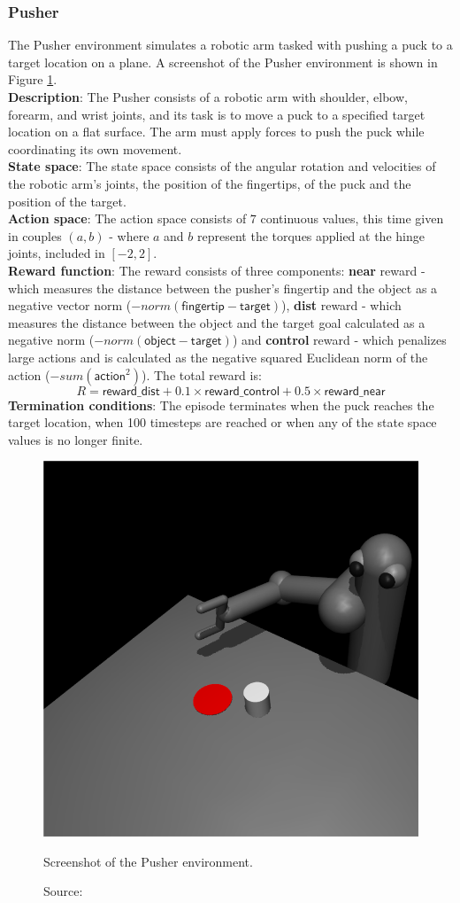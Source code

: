 \subsubsection{Pusher}

The Pusher environment \cite{pusherfarama} simulates
a robotic arm tasked with pushing a puck to a target
location on a plane.
A screenshot of the Pusher environment is shown in Figure \ref{fig:pusher}.\\
\textbf{Description}: The Pusher consists of a
robotic arm with shoulder, elbow, forearm, and wrist joints,
and its task is to move a puck to a specified
target location on a flat surface.
The arm must apply forces to push the puck while
coordinating its own movement.\\
\textbf{State space}: The state space consists
of the angular rotation and velocities of the robotic arm's joints,
the position of the fingertips, of the puck and the position of the target.\\
\textbf{Action space}: The action space consists of $7$ continuous values,
this time given in couples $(a,b)$ - where 
$a$ and $b$ represent the torques applied at the hinge joints,
included in $[-2, 2]$.\\
\textbf{Reward function}: The reward consists of three components:
\textbf{near} reward - which measures the distance between the
pusher's fingertip and the object as a negative vector norm
($-norm(\textsf{fingertip} - \textsf{target})$),
\textbf{dist} reward - which measures the distance between
the object and the target goal calculated as a negative norm
($- norm(\textsf{object} - \textsf{target})$)
and \textbf{control} reward - which penalizes large actions
and is calculated as the negative squared Euclidean norm of the action
($- sum(\textsf{action}^2)$). The total reward is:
\begin{equation}
    R = \textsf{reward\_dist} + 0.1 \times \textsf{reward\_control} + 0.5 \times \textsf{reward\_near}
\end{equation}
\textbf{Termination conditions}: The episode terminates when the puck
reaches the target location, when 100 timesteps are reached
or when any of the state space values is no longer finite.

\begin{figure}[h]
    \centering
    \includegraphics[width=.4\textwidth]{figures/ch4/pusher.png}
    \caption{Screenshot of the Pusher environment.}
    \vspace{-10px}
    \caption*{\scriptsize{Source: \cite{pusherpic}}}
    \label{fig:pusher}
\end{figure}

